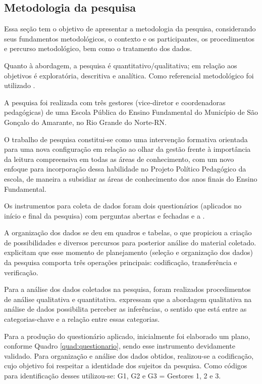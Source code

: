 \begin{refsection}
    \section{Metodologia da pesquisa}

    Essa seção tem o objetivo de apresentar a metodologia da pesquisa, considerando seus fundamentos metodológicos, o contexto e os participantes, os procedimentos e percurso metodológico, bem como o tratamento dos dados. 

    Quanto à abordagem, a pesquisa é quantitativo/qualitativa; em relação aos objetivos é exploratória, descritiva e analítica. Como referencial metodológico foi utilizado \textcite{LavilleAndDionne1999Construcao}. 

    A pesquisa foi realizada com três gestores (vice-diretor e coordenadoras pedagógicas) de uma Escola Pública do Ensino Fundamental do Município de São Gonçalo do Amarante, no Rio Grande do Norte-RN. 

    O trabalho de pesquisa constitui-se como uma intervenção formativa orientada para uma nova configuração em relação ao olhar da gestão frente à importância da leitura compreensiva em todas as áreas de conhecimento, com um novo enfoque para incorporação dessa habilidade no Projeto Político Pedagógico da escola, de maneira a subsidiar as áreas de conhecimento dos anos finais do Ensino Fundamental.  

    Os instrumentos para coleta de dados foram dois questionários (aplicados no início e final da pesquisa) com perguntas abertas e fechadas e a \textcite{BaNacCurEF2017}. 

    A organização dos dados se deu em quadros e tabelas, o que propiciou a criação de possibilidades e diversos percursos para posterior análise do material coletado. \textcite{LavilleAndDionne1999Construcao} explicitam que esse momento de planejamento (seleção e organização dos dados) da pesquisa comporta três operações principais: codificação, transferência e verificação.  

    Para a análise dos dados coletados na pesquisa, foram realizados procedimentos de análise qualitativa e quantitativa. \textcite{LavilleAndDionne1999Construcao} expressam que a abordagem qualitativa na análise de dados possibilita perceber as inferências, o sentido que está entre as categorias-chave e a relação entre essas categorias.  

    Para a produção do questionário aplicado, inicialmente foi elaborado um plano, conforme Quadro \ref{quad:questionario}, sendo esse instrumento devidamente validado. Para organização e análise dos dados obtidos, realizou-se a codificação, cujo objetivo foi respeitar a identidade dos sujeitos da pesquisa. Como códigos para identificação desses utilizou-se: G1, G2 e G3 = Gestores 1, 2 e 3.


\end{refsection}
